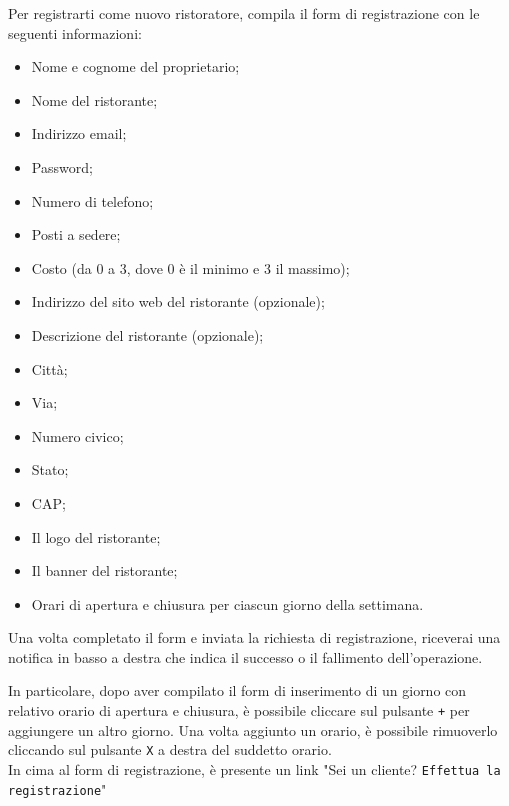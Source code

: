 Per registrarti come nuovo ristoratore, compila il form di registrazione con le
seguenti informazioni:
\begin{itemize}
	\item Nome e cognome del proprietario;
	\item Nome del ristorante;
	\item Indirizzo email;
	\item Password;
	\item Numero di telefono;
	\item Posti a sedere;
	\item Costo (da 0 a 3, dove 0 è il minimo e 3 il massimo);
	\item Indirizzo del sito web del ristorante (opzionale);
	\item Descrizione del ristorante (opzionale);
	\item Città;
	\item Via;
	\item Numero civico;
	\item Stato;
	\item CAP;
	\item Il logo del ristorante;
	\item Il banner del ristorante;
	\item Orari di apertura e chiusura per ciascun giorno della settimana.
\end{itemize}

Una volta completato il form e inviata la richiesta di registrazione, riceverai 
una notifica in basso a destra che indica il successo o il fallimento
dell'operazione.

In particolare, dopo aver compilato il form di inserimento di un giorno con
relativo orario di apertura e chiusura, è possibile cliccare sul pulsante
\texttt{+} per aggiungere un altro giorno. Una volta aggiunto un orario, è
possibile rimuoverlo cliccando sul pulsante \texttt{X} a destra del suddetto
orario.\\
In cima al form di registrazione, è presente un link "Sei un cliente? \texttt{Effettua la registrazione}"
